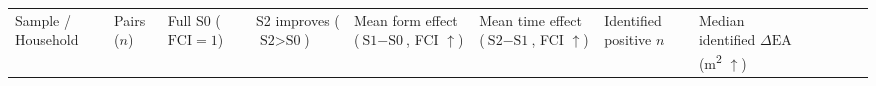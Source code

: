\documentclass[12pt,letterpaper]{article}
\begin{document}
\begin{landscape}
{\def\LTcaptype{none} %
\begin{longtable}[]{@{}
  >{\raggedright\arraybackslash}p{}
  >{\raggedleft\arraybackslash}p{}
  >{\raggedleft\arraybackslash}p{}
  >{\raggedleft\arraybackslash}p{}
  >{\raggedright\arraybackslash}p{}
  >{\raggedright\arraybackslash}p{}
  >{\raggedleft\arraybackslash}p{}
  >{\raggedright\arraybackslash}p{}
  >{\raggedleft\arraybackslash}p{}
  >{\raggedright\arraybackslash}p{}
  >{\raggedright\arraybackslash}p{}
  >{\raggedright\arraybackslash}p{}@{}}
\toprule\noalign{}
\begin{minipage}[b]{\linewidth}\raggedright
Sample / Household
\end{minipage} & \begin{minipage}[b]{\linewidth}\raggedleft
Pairs (\(n\))
\end{minipage} & \begin{minipage}[b]{\linewidth}\raggedleft
Full S0 (\(\text{FCI}=1\))
\end{minipage} & \begin{minipage}[b]{\linewidth}\raggedleft
S2 improves (\(\text{S2}>\text{S0}\))
\end{minipage} & \begin{minipage}[b]{\linewidth}\raggedright
Mean form effect (\(\text{S1}-\text{S0}\), FCI \ensuremath{\uparrow})
\end{minipage} & \begin{minipage}[b]{\linewidth}\raggedright
Mean time effect (\(\text{S2}-\text{S1}\), FCI \ensuremath{\uparrow})
\end{minipage} & \begin{minipage}[b]{\linewidth}\raggedleft
Identified positive \(n\)
\end{minipage} & \begin{minipage}[b]{\linewidth}\raggedright
Median identified \(\Delta\text{EA}\) (m\textsuperscript{2} \ensuremath{\uparrow})
\end{minipage} & \begin{minipage}[b]{\linewidth}\raggedleft

\end{minipage}
\end{longtable}}
\end{landscape}
\end{document}
